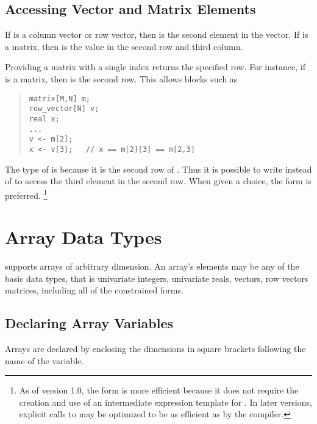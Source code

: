 \subsection{Accessing Vector and Matrix Elements}

If  is a column vector or row vector, then  is the
second element in the vector.  If  is a matrix, then
 is the value in the second row and third column.

Providing a matrix with a single index returns the specified row.  For
instance, if  is a matrix, then  is the second row.
This allows \Stan blocks such as
%
\begin{quote}
\begin{Verbatim} 
matrix[M,N] m;    
row_vector[N] v;    
real x;
...
v <- m[2];   
x <- v[3];   // x == m[2][3] == m[2,3]
\end{Verbatim}
\end{quote}
% 
The type of  is  because it is the second
row of .  Thus it is possible to write  instead
of  to access the third element in the second row.  When
given a choice, the form  is preferred.%
%
\footnote{As of \Stan version 1.0, the form
   is more efficient because it does not require the
  creation and use of an intermediate expression template for
  .  In later versions, explicit calls to 
  may be optimized to be as efficient as  by the \Stan
  compiler.\label{array-index-style.footnote}}


\section{Array Data Types}

\Stan supports arrays of arbitrary dimension.  An array's elements may
be any of the basic data types, that is univariate integers,
univariate reals, vectors, row vectors matrices, including all of the
constrained forms.

\subsection{Declaring Array Variables}

Arrays are declared by enclosing the dimensions in square brackets
following the name of the variable.

